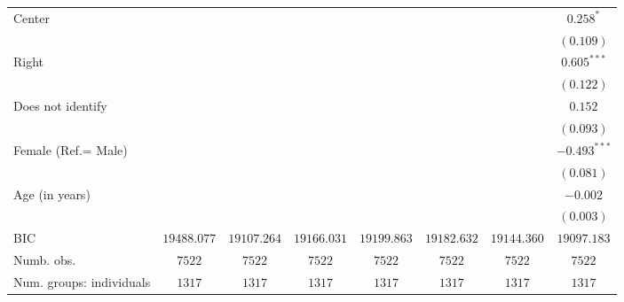 \documentclass[
  12pt,
]{article}
\begin{document}
\begin{table}
\begin{center}
{\begin{tabular}{l c c c c c c c}
\quad Center                                          &                &                &                &                &                &               & $0.258^{*}$    \\
                                                      &                &                &                &                &                &               & $(0.109)$      \\
\quad Right                                           &                &                &                &                &                &               & $0.605^{***}$  \\
                                                      &                &                &                &                &                &               & $(0.122)$      \\
\quad Does not identify                               &                &                &                &                &                &               & $0.152$        \\
                                                      &                &                &                &                &                &               & $(0.093)$      \\
Female (Ref.= Male)                                   &                &                &                &                &                &               & $-0.493^{***}$ \\
                                                      &                &                &                &                &                &               & $(0.081)$      \\
Age (in years)                                        &                &                &                &                &                &               & $-0.002$       \\
                                                      &                &                &                &                &                &               & $(0.003)$      \\
\hline
BIC                                                   & $19488.077$    & $19107.264$    & $19166.031$    & $19199.863$    & $19182.632$    & $19144.360$   & $19097.183$    \\
Numb. obs.                                            & $7522$         & $7522$         & $7522$         & $7522$         & $7522$         & $7522$        & $7522$         \\
Num. groups: individuals                              & $1317$         & $1317$         & $1317$         & $1317$         & $1317$         & $1317$        & $1317$         \\

\end{tabular}}
\end{center}
\end{table}
\end{document}
